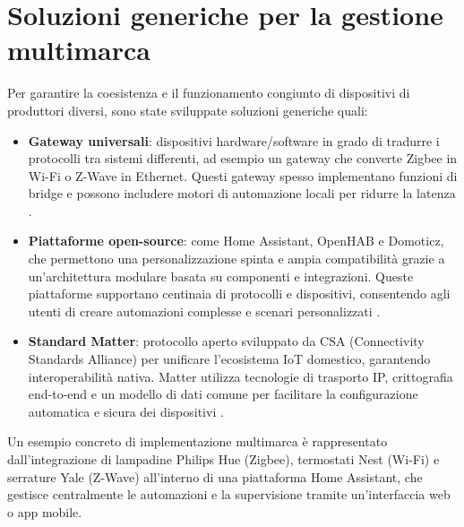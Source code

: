 \section{Soluzioni generiche per la gestione multimarca}
Per garantire la coesistenza e il funzionamento congiunto di dispositivi di produttori diversi, sono state sviluppate soluzioni generiche quali:
\begin{itemize}
    \item \textbf{Gateway universali}: dispositivi hardware/software in grado di tradurre i protocolli tra sistemi differenti, ad esempio un gateway che converte Zigbee in Wi-Fi o Z-Wave in Ethernet. Questi gateway spesso implementano funzioni di bridge e possono includere motori di automazione locali per ridurre la latenza \cite{Smith2022}.
    \item \textbf{Piattaforme open-source}: come Home Assistant, OpenHAB e Domoticz, che permettono una personalizzazione spinta e ampia compatibilità grazie a un’architettura modulare basata su componenti e integrazioni. Queste piattaforme supportano centinaia di protocolli e dispositivi, consentendo agli utenti di creare automazioni complesse e scenari personalizzati \cite{HomeAssistant2024}.
    \item \textbf{Standard Matter}: protocollo aperto sviluppato da CSA (Connectivity Standards Alliance) per unificare l'ecosistema IoT domestico, garantendo interoperabilità nativa. Matter utilizza tecnologie di trasporto IP, crittografia end-to-end e un modello di dati comune per facilitare la configurazione automatica e sicura dei dispositivi \cite{ConnectivityStandardsAlliance2023}.
\end{itemize}

Un esempio concreto di implementazione multimarca è rappresentato dall’integrazione di lampadine Philips Hue (Zigbee), termostati Nest (Wi-Fi) e serrature Yale (Z-Wave) all’interno di una piattaforma Home Assistant, che gestisce centralmente le automazioni e la supervisione tramite un’interfaccia web o app mobile.

